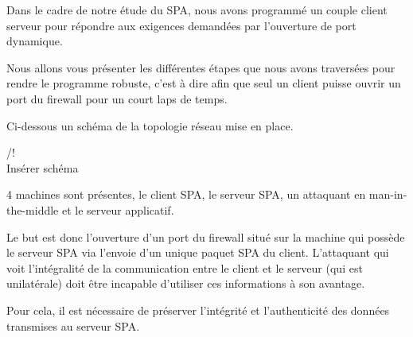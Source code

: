 Dans le cadre de notre étude du SPA, nous avons programmé un couple client serveur pour répondre aux exigences demandées par l'ouverture de port dynamique.

Nous allons vous présenter les différentes étapes que nous avons traversées pour rendre le programme robuste, c'est à dire afin que seul un client puisse ouvrir un port du firewall pour un court laps de temps.

Ci-dessous un schéma de la topologie réseau mise en place.

/!\\ Insérer schéma

4 machines sont présentes, le client SPA, le serveur SPA, un attaquant en man-in-the-middle et le serveur applicatif.

Le but est donc l'ouverture d'un port du firewall situé sur la machine qui possède le serveur SPA via l'envoie d'un unique paquet SPA du client. L'attaquant qui voit l'intégralité de la communication entre le client et le serveur (qui est unilatérale) doit être incapable d'utiliser ces informations à son avantage.

Pour cela, il est nécessaire de préserver l'intégrité et l'authenticité des données transmises au serveur SPA.
